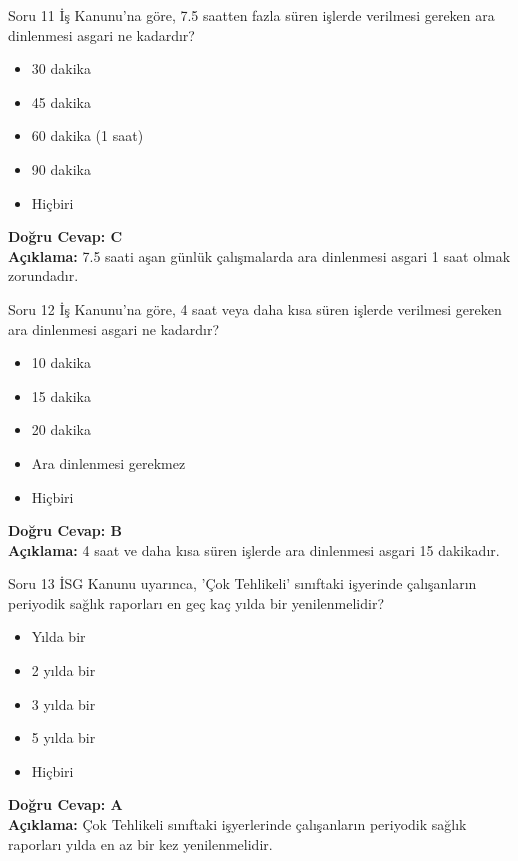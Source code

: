 \documentclass[12pt,a4paper]{article}
\begin{document}
\begin{testcard}{Soru 11}
    İş Kanunu'na göre, 7.5 saatten fazla süren işlerde verilmesi gereken ara dinlenmesi asgari ne kadardır?
    \begin{itemize}
        \item[A)] 30 dakika
        \item[B)] 45 dakika
        \item[C)] 60 dakika (1 saat)
        \item[D)] 90 dakika
        \item[E)] Hiçbiri
    \end{itemize}
    \tcblower
    \textbf{Doğru Cevap: C} \\
    \textbf{Açıklama:} 7.5 saati aşan günlük çalışmalarda ara dinlenmesi asgari 1 saat olmak zorundadır.
\end{testcard}

\begin{testcard}{Soru 12}
    İş Kanunu'na göre, 4 saat veya daha kısa süren işlerde verilmesi gereken ara dinlenmesi asgari ne kadardır?
    \begin{itemize}
        \item[A)] 10 dakika
        \item[B)] 15 dakika
        \item[C)] 20 dakika
        \item[D)] Ara dinlenmesi gerekmez
        \item[E)] Hiçbiri
    \end{itemize}
    \tcblower
    \textbf{Doğru Cevap: B} \\
    \textbf{Açıklama:} 4 saat ve daha kısa süren işlerde ara dinlenmesi asgari 15 dakikadır.
\end{testcard}

\begin{testcard}{Soru 13}
    İSG Kanunu uyarınca, 'Çok Tehlikeli' sınıftaki işyerinde çalışanların periyodik sağlık raporları en geç kaç yılda bir yenilenmelidir?
    \begin{itemize}
        \item[A)] Yılda bir
        \item[B)] 2 yılda bir
        \item[C)] 3 yılda bir
        \item[D)] 5 yılda bir
        \item[E)] Hiçbiri
    \end{itemize}
    \tcblower
    \textbf{Doğru Cevap: A} \\
    \textbf{Açıklama:} Çok Tehlikeli sınıftaki işyerlerinde çalışanların periyodik sağlık raporları yılda en az bir kez yenilenmelidir.
\end{testcard}
\end{document}
